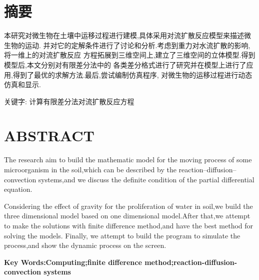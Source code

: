 
\chapter*{摘\qquad 要}
本研究对微生物在土壤中运移过程进行建模,具体采用对流扩散反应模型来描述微生物的运动.
并对它的定解条件进行了讨论和分析.考虑到重力对水流扩散的影响,将一维上的对流扩散反应
方程拓展到三维空间上,建立了三维空间的立体模型.得到模型后,本文分别对有限差分法中的
各类差分格式进行了研究并在模型上进行了应用,得到了最优的求解方法.最后,尝试编制仿真程序,
对微生物的运移过程进行动态仿真和显示.\par
\vspace*{\baselineskip}
{\heiti 关键字: 计算\quad 有限差分法\quad 对流扩散反应方程}
\clearpage{\pagestyle{empty}\cleardoublepage}
\chapter*{ABSTRACT}

The research aim to build the mathematic model for the moving process of
some microorganism in the soil,which can be described by the 
reaction--diffusion--convection systems,and we discuss the definite condition of 
the partial differential equation.\par Considering the effect of gravity for the  proliferation of water
in soil,we build the three dimensional model based on one dimensional model.After that,we attempt to
make the solutions with finite difference method,and have the best method for solving the models.
Finally, we attempt to build the program to simulate the process,and show the dynamic process on
the screen.\par
\vspace*{1.5em}
\noindent\textbf{Key Words:Computing;finite difference method;reaction-diffusion-convection systems}